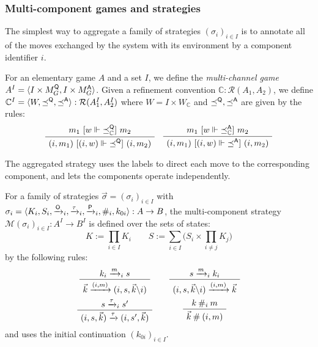 \subsubsection{Multi-component games and strategies} %

The simplest way to aggregate a family of strategies $(\sigma_i)_{i\in I}$
is to annotate all of the moves exchanged by the system with its environment
by a component identifier $i$.

\begin{definition} %
For an elementary game $A$ and a set $I$,
we define the \emph{multi-channel game}
$A^I = \langle I \times M_G^{ \mathsf{Q} }, I \times M_G^{ \mathsf{A} } \rangle$.
Given a refinement convention
$\mathbb{C} : \mathcal{R}(A_1, A_2)$,
we define
$\mathbb{C}^I =
 \langle W, {\preceq}^{ \mathsf{Q} }, {\preceq}^{ \mathsf{A} } \rangle :
 \mathcal{R}(A_1^I, A_2^I)$
where
$W = I \times W_\mathbb{C}$ and
$\preceq^{ \mathsf{Q} }, \preceq^{ \mathsf{A} }$
are given by the rules:
\[
    \small
    \AxiomC{$m_1 \ifr{w \Vdash {\preceq}_\mathbb{C}^\kw{Q}} m_2$}
    \UnaryInfC{$(i, m_1) \ifr{(i, w) \Vdash {\preceq}^\kw{Q}} (i, m_2)$}
    \DisplayProof
    \quad
    \AxiomC{$m_1 \ifr{w \Vdash {\preceq}_\mathbb{C}^\kw{A}} m_2$}
    \UnaryInfC{$(i, m_1) \ifr{(i, w) \Vdash {\preceq}^\kw{A}} (i, m_2)$}
    \DisplayProof
\]
\end{definition}

The aggregated strategy uses the labels to direct each move
to the corresponding component,
and lets the components operate independently.

\begin{definition} %
For a family of strategies
$\vec{\sigma} = (\sigma_i)_{i \in I}$
with
$\sigma_i = \langle K_i, S_i, \xrightarrow{ \mathsf{O} }_i,
  \xrightarrow{\tau}_i, \xrightarrow{ \mathsf{P} }_i, \#_i, k_{0i} \rangle :
  A \rightarrow B$,
the multi-component strategy
$\mathcal{M}(\sigma_i)_{i \in I} : A^I \rightarrow B^I$
is defined over the sets of states:
\[
  K := \prod_{i \in I} K_i \qquad
  S := \sum_{i \in I}
    \Big( S_i \times \prod_{i \ne j} K_j \Big)
\]
by the following rules:
\[
  \begin{array}{c@{\qquad}c}
    \AxiomC{$k_i \xrightarrow{m}_i s$}
    \UnaryInfC{$\vec{k} \xrightarrow{(i, m)} (i, s, \vec{k} \backslash i)$}
    \DisplayProof
    &
    \AxiomC{$s \xrightarrow{m}_i k_i$}
    \UnaryInfC{$(i, s, \vec{k} \backslash i) \xrightarrow{(i, m)} \vec{k}$}
    \DisplayProof
    \\[1.5em]
    \AxiomC{$s \xrightarrow{\tau}_i s'$}
    \UnaryInfC{$(i, s, \vec{k}) \xrightarrow{\tau} (i, s', \vec{k})$}
    \DisplayProof
    &
    \AxiomC{$k \: \#_i \: m$}
    \UnaryInfC{$\vec{k} \: \# \: (i, m)$}
    \DisplayProof
  \end{array}
\]
and uses the initial continuation $(k_{0i})_{i \in I}$.
\end{definition}

